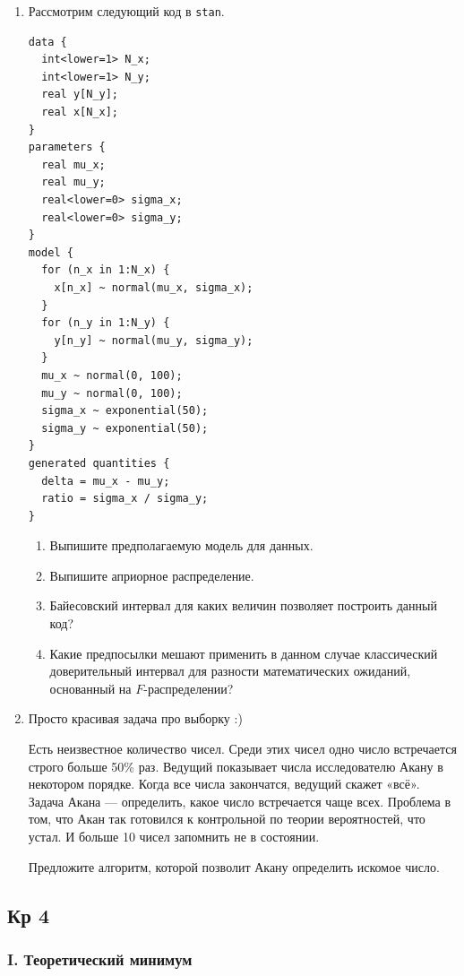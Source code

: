 \documentclass[12pt, a4paper]{article}\usepackage[]{graphicx}\usepackage[]{color}
\begin{document}
\begin{enumerate}
\newpage
\item Рассмотрим следующий код в \verb|stan|.

\begin{verbatim}
data {
  int<lower=1> N_x;
  int<lower=1> N_y;
  real y[N_y];
  real x[N_x];
}
parameters {
  real mu_x;
  real mu_y;
  real<lower=0> sigma_x;
  real<lower=0> sigma_y;
}
model {
  for (n_x in 1:N_x) {
    x[n_x] ~ normal(mu_x, sigma_x);
  }
  for (n_y in 1:N_y) {
    y[n_y] ~ normal(mu_y, sigma_y);
  }
  mu_x ~ normal(0, 100);
  mu_y ~ normal(0, 100);
  sigma_x ~ exponential(50);
  sigma_y ~ exponential(50);
}
generated quantities {
  delta = mu_x - mu_y;
  ratio = sigma_x / sigma_y;
}
\end{verbatim}

\begin{enumerate}
\item Выпишите предполагаемую модель для данных.
\item Выпишите априорное распределение.
\item Байесовский интервал для каких величин позволяет построить данный код?
\item Какие предпосылки мешают применить в данном случае классический доверительный интервал для разности математических ожиданий, основанный на $F$-распределении?
\end{enumerate}

\item Просто красивая задача про выборку :)

Есть неизвестное количество чисел. Среди этих чисел одно число встречается строго больше 50\% раз. Ведущий показывает числа исследователю Акану в некотором порядке. Когда все числа закончатся, ведущий скажет «всё». Задача Акана — определить, какое число встречается чаще всех. Проблема в том, что Акан так готовился к контрольной по теории вероятностей, что устал. И больше 10 чисел запомнить не в состоянии.

Предложите алгоритм, которой позволит Акану определить искомое число.

\end{enumerate}




\subsection{Кр 4}


\subsubsection*{I. Теоретический минимум}
\end{document}
